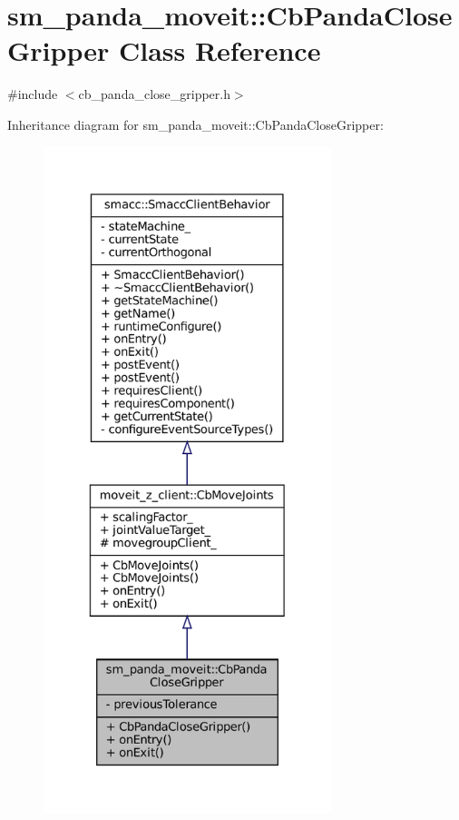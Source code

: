 \hypertarget{classsm__panda__moveit_1_1CbPandaCloseGripper}{}\section{sm\+\_\+panda\+\_\+moveit\+:\+:Cb\+Panda\+Close\+Gripper Class Reference}
\label{classsm__panda__moveit_1_1CbPandaCloseGripper}


{\ttfamily \#include $<$cb\+\_\+panda\+\_\+close\+\_\+gripper.\+h$>$}



Inheritance diagram for sm\+\_\+panda\+\_\+moveit\+:\+:Cb\+Panda\+Close\+Gripper\+:
\nopagebreak
\begin{figure}[H]
\begin{center}
\leavevmode
\includegraphics[height=550pt]{classsm__panda__moveit_1_1CbPandaCloseGripper__inherit__graph}
\end{center}
\end{figure}


